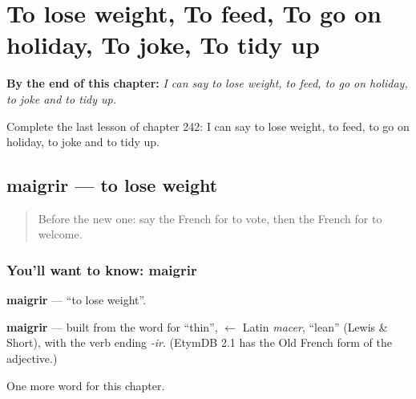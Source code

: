 
\chapter{To lose weight, To feed, To go on holiday, To joke, To tidy up}
\label{ch:fr-to-lose-weight-to-feed-to-go-on-holiday-to-joke-to-tidy-up}

\begin{chapteropening}
\textbf{By the end of this chapter:} \emph{I can say to lose weight, to feed, to go on holiday, to joke and to tidy up.}

Complete the last lesson of chapter 242: I can say to lose weight, to feed, to go on holiday, to joke and to tidy up.
\end{chapteropening}

\section[maigrir]{maigrir — to lose weight}

\label{lesson:FR-C242-maigrir}



\begin{quote}
Before the new one: say the French for to vote, then the French for to welcome.
\end{quote}

\subsection*{You'll want to know: maigrir}
\textbf{maigrir} — \textquotedblleft{}to lose weight\textquotedblright{}.

\begin{cousinweb}
\textbf{maigrir} — built from the word for \textquotedblleft{}thin\textquotedblright{}, $\leftarrow$ Latin \emph{macer}, \textquotedblleft{}lean\textquotedblright{} (Lewis \& Short), with the verb ending \emph{-ir}. (EtymDB 2.1 has the Old French form of the adjective.)
\end{cousinweb}

\begin{grammarlens}[title={What you've built}]
One more word for this chapter.
\end{grammarlens}

